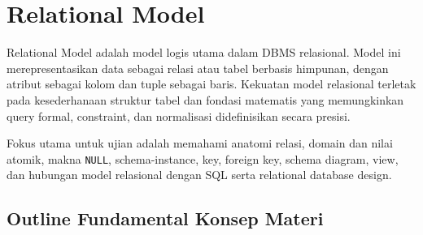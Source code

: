 \section{Relational Model}

Relational Model adalah model logis utama dalam DBMS relasional. Model ini merepresentasikan data sebagai relasi atau tabel berbasis himpunan, dengan atribut sebagai kolom dan tuple sebagai baris. Kekuatan model relasional terletak pada kesederhanaan struktur tabel dan fondasi matematis yang memungkinkan query formal, constraint, dan normalisasi didefinisikan secara presisi.

Fokus utama untuk ujian adalah memahami anatomi relasi, domain dan nilai atomik, makna \texttt{NULL}, schema-instance, key, foreign key, schema diagram, view, dan hubungan model relasional dengan SQL serta relational database design.

\subsection{Outline Fundamental Konsep Materi}

